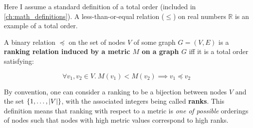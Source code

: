%

Here I assume a standard definition of a total order (included in \cref{ch:math_definitions}).
A less-than-or-equal relation ($\leq$) on real numbers $\mathbb{R}$ is an example of a total order.

\begin{definition}
    \label{def:ranking_relation}
    A binary relation $\preceq$ on the set of nodes $V$ of some graph $G = (V, E)$ is a \textbf{ranking relation induced by a metric $M$ on a graph $G$} iff it is a total order satisfying:

    \[ \forall v_1, v_2 \in V.\ M(v_1) < M(v_2) \implies v_1 \preceq v_2 \]
\end{definition}

By convention, one can consider a ranking to be a bijection between nodes $V$ and the set $\left\{1, \dots, \left\lvert V \right\rvert\right\}$, with the associated integers being called \textbf{ranks}.
This definition means that ranking with respect to a metric is \textsl{one of possible} orderings of nodes such that nodes with high metric values correspond to high ranks.

